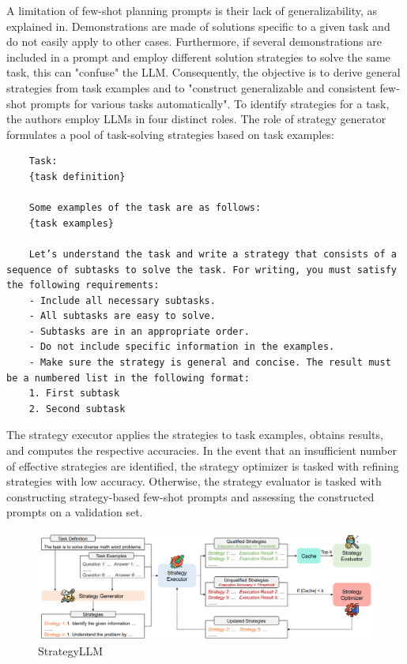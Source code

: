 \documentclass{article}
\begin{document}
A limitation of few-shot planning prompts is their lack of generalizability, as explained in\cite{gao_strategyllm_2024}. Demonstrations are made of solutions specific to a given task and do not easily apply to other cases. Furthermore, if several demonstrations are included in a prompt and employ different solution strategies to solve the same task, this can "confuse" the LLM. Consequently, the objective is to derive general strategies from task examples and to "construct generalizable and consistent few-shot prompts for various tasks automatically".
To identify strategies for a task, the authors employ LLMs in four distinct roles. The role of strategy generator formulates a pool of task-solving strategies based on task examples: 
\begin{verbatim}
	Task: 
	{task definition} 
	
	Some examples of the task are as follows: 
	{task examples} 
	
	Let’s understand the task and write a strategy that consists of a sequence of subtasks to solve the task. For writing, you must satisfy the following requirements: 
	- Include all necessary subtasks. 
	- All subtasks are easy to solve. 
	- Subtasks are in an appropriate order. 
	- Do not include specific information in the examples. 
	- Make sure the strategy is general and concise. The result must be a numbered list in the following format: 
	1. First subtask 
	2. Second subtask
\end{verbatim}
The strategy executor applies the strategies to task examples, obtains results, and computes the respective accuracies. In the event that an insufficient number of effective strategies are identified, the strategy optimizer is tasked with refining strategies with low accuracy. Otherwise, the strategy evaluator is tasked with constructing strategy-based few-shot prompts and assessing the constructed prompts on a validation set.
\begin{figure}[h]
	\centering
	\includegraphics[width=0.9\linewidth]{StrategyLLM.png}
	\caption{StrategyLLM \cite{gao_strategyllm_2024}}
	\label{fig:strategyllm}
\end{figure}
\end{document}
